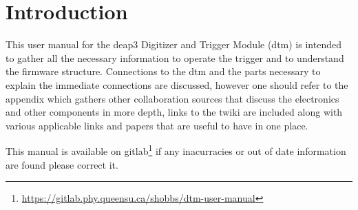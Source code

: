 \chapter{Introduction}

This user manual for the \gls{deap3} Digitizer and Trigger Module (\gls{dtm}) is intended to gather all the necessary information to operate the trigger and to understand the firmware structure. Connections to the \gls{dtm} and the parts necessary to explain the immediate connections are discussed, however one should refer to the appendix which gathers other collaboration sources that discuss the electronics and other components in more depth, links to the twiki are included along with various applicable links and papers that are useful to have in one place.

This manual is available on gitlab\footnote{\url{https://gitlab.phy.queensu.ca/shobbs/dtm-user-manual}} if any inacurracies or out of date information are found please correct it.
